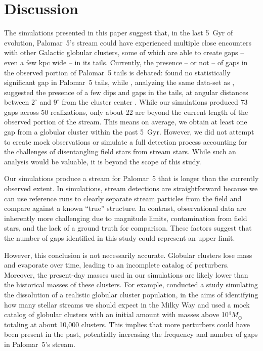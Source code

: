 \documentclass[draft]{aa}
\begin{document}
  
  
\section{Discussion}
  
  The simulations presented in this paper suggest that, in the last 5~Gyr of evolution, Palomar~5's stream could have experienced multiple close encounters with other Galactic globular clusters, some of which are able to create gaps -- even a few kpc wide -- in its tails. Currently, the presence -- or not -- of gaps in the observed portion of Palomar~5 tails is debated: \citet{2016ApJ...819....1I} found no statistically significant gap in Palomar~5 tails, while \citet{2017MNRAS.470...60E}, analyzing the same data-set as \citet{2016ApJ...819....1I}, suggested the presence of a few dips and gaps in the tails, at angular distances between $2^\circ$ and $9^\circ$ from the cluster center \citep[see also][]{ 2020ApJ...889...70B}. While our simulations produced 73 gaps across 50 realizations, only about 22 are beyond the current length of the observed portion of the stream. This means on average, we obtain at least one gap from a globular cluster within the past 5~Gyr. However, we did not attempt to create mock observations or simulate a full detection process accounting for the challenges of disentangling field stars from stream stars. While such an analysis would be valuable, it is beyond the scope of this study.

  
  Our simulations produce a stream for Palomar~5 that is longer than the currently observed extent. In simulations, stream detections are straightforward because we can use reference runs to clearly separate stream particles from the field and compare against a known ``true'' structure. In contrast, observational data are inherently more challenging due to magnitude limits, contamination from field stars, and the lack of a ground truth for comparison. These factors suggest that the number of gaps identified in this study could represent an upper limit.

  However, this conclusion is not necessarily accurate. Globular clusters lose mass and evaporate over time, leading to an incomplete catalog of perturbers. Moreover, the present-day masses used in our simulations are likely lower than the historical masses of these clusters. For example, \citet{2024ApJ...976...54P} conducted a study simulating the dissolution of a realistic globular cluster population, in the aims of identifying how many stellar streams we should expect in the Milky Way and used a mock catalog of globular clusters with an initial amount with masses above 10$^4 M_\odot$ totaling at about 10,000 clusters. This implies that more perturbers could have been present in the past, potentially increasing the frequency and number of gaps in Palomar~5's stream.
  
\end{document}
